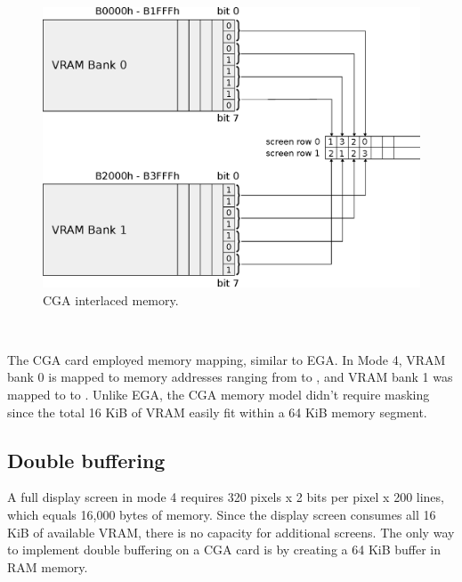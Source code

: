 \documentclass[book.tex]{subfiles}
\begin{document}
\begin{figure}[H]
\centering
\includegraphics[width=1.0\textwidth]{imgs/drawings/cga_interlace.eps}
\caption{CGA interlaced memory.}
\label{fig:cga_interlaced}
\end{figure}






\\


\par
The CGA card employed memory mapping, similar to EGA. In Mode 4, VRAM bank 0 is mapped to memory addresses ranging from  to , and VRAM bank 1 was mapped to  to . Unlike EGA, the CGA memory model didn't require masking since the total 16 KiB of VRAM easily fit within a 64 KiB memory segment.



\subsection{Double buffering}
A full display screen in mode 4 requires 320 pixels x 2 bits per pixel x 200 lines, which equals 16,000 bytes of memory. Since the display screen consumes all 16 KiB of available VRAM, there is no capacity for additional screens. The only way to implement double buffering on a CGA card is by creating a 64 KiB buffer in RAM memory.\\
\end{document}
